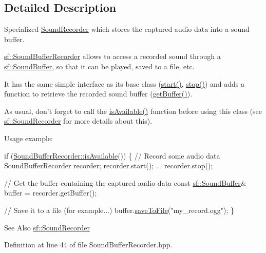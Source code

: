 \subsection{Detailed Description}
Specialized \hyperlink{classsf_1_1_sound_recorder}{Sound\-Recorder} which stores the captured audio data into a sound buffer. 

\hyperlink{classsf_1_1_sound_buffer_recorder}{sf\-::\-Sound\-Buffer\-Recorder} allows to access a recorded sound through a \hyperlink{classsf_1_1_sound_buffer}{sf\-::\-Sound\-Buffer}, so that it can be played, saved to a file, etc.

It has the same simple interface as its base class (\hyperlink{classsf_1_1_sound_recorder_a777e633114f7221cd7554a6ed486259e}{start()}, \hyperlink{classsf_1_1_sound_recorder_a8d9c8346aa9aa409cfed4a1101159c4c}{stop()}) and adds a function to retrieve the recorded sound buffer (\hyperlink{classsf_1_1_sound_buffer_recorder_a84fd636ad22f434bafe2a7c15a8e5107}{get\-Buffer()}).

As usual, don't forget to call the \hyperlink{classsf_1_1_sound_recorder_aab2bd0fee9e48d6cfd449b1cb078ce5a}{is\-Available()} function before using this class (see \hyperlink{classsf_1_1_sound_recorder}{sf\-::\-Sound\-Recorder} for more details about this).

Usage example\-: 
\begin{DoxyCode}
\textcolor{keywordflow}{if} (\hyperlink{classsf_1_1_sound_recorder_aab2bd0fee9e48d6cfd449b1cb078ce5a}{SoundBufferRecorder::isAvailable}())
\{
    \textcolor{comment}{// Record some audio data}
    SoundBufferRecorder recorder;
    recorder.start();
    ...
    recorder.stop();

    \textcolor{comment}{// Get the buffer containing the captured audio data}
    \textcolor{keyword}{const} \hyperlink{classsf_1_1_sound_buffer}{sf::SoundBuffer}& buffer = recorder.getBuffer();

    \textcolor{comment}{// Save it to a file (for example...)}
    buffer.\hyperlink{classsf_1_1_sound_buffer_ab2083dc1a934c64959d9e3f162328a76}{saveToFile}(\textcolor{stringliteral}{"my\_record.ogg"});
\}
\end{DoxyCode}


\begin{DoxySeeAlso}{See Also}
\hyperlink{classsf_1_1_sound_recorder}{sf\-::\-Sound\-Recorder} 
\end{DoxySeeAlso}


Definition at line 44 of file Sound\-Buffer\-Recorder.\-hpp.



